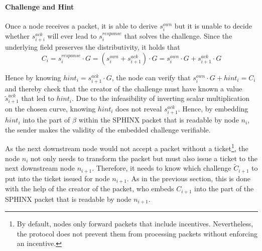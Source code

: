 \paragraph{Challenge and Hint}
\label{sec:incentives:proofofrelay:challenge}

Once a node receives a packet, it is able to derive $s_i^{own}$ but it is unable to decide whether $s_{i+i}^{ack}$ will ever lead to $s_i^{response}$ that solves the challenge. Since the underlying field preserves the distributivity, it holds that $$C_i = s_i^{response} \cdot G = (s_i^{own} + s_{i+1}^{ack}) \cdot G = s_i^{own} \cdot G + s_{i+1}^{ack} \cdot G$$

Hence by knowing $hint_i = s_{i+1}^{ack} \cdot G$, the node can verify that $s_i^{own} \cdot G + hint_i = C_i$ and thereby check that the creator of the challenge must have known a value $\tilde{s}_{i+1}^{ack}$ that led to $hint_i$. Due to the infeasibility of inverting scalar multiplication on the chosen curve, knowing $hint_i$ does not reveal $s_{i+1}^{ack}$. Hence, by embedding $hint_i$ into the part of $\beta$ within the SPHINX packet that is readable by node $n_i$, the sender makes the validity of the embedded challenge verifiable.

As the next downstream node would not accept a packet without a ticket\footnote{By default, nodes only forward packets that include incentives. Nevertheless, the protocol does not prevent them from processing packets without enforcing an incentive.}, the node $n_i$ not only needs to transform the packet but must also issue a ticket to the next downstream node $n_{i+1}$. Therefore, it needs to know which challenge $\tilde{C}_{i+1}$ to put into the ticket issued for node $n_{i+1}$. As in the previous section, this is done with the help of the creator of the packet, who embeds $C_{i+1}$ into the part of the SPHINX packet that is readable by node $n_{i+1}$.

